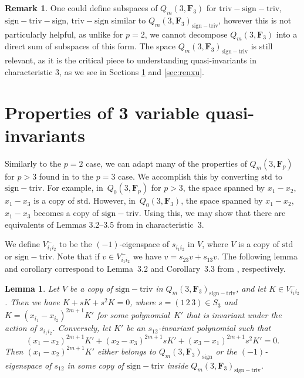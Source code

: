 \documentclass[11pt]{article}
\numberwithin{equation}{section}
\newtheorem{Lemma}[Theorem]{Lemma}
\theoremstyle{definition}
\newtheorem{Remark}[Theorem]{Remark}
\numberwithin{equation}{section}
\newcommand{\std}{\mathrm{std}}
\newcommand{\sign}{\mathrm{sign}}
\newcommand{\trix}{\mathrm{triv-sign-triv}}
\newcommand{\six}{\mathrm{sign-triv-sign}}
\newcommand{\siv}{\mathrm{sign-triv}}
\newcommand{\tign}{\mathrm{triv-sign}}
\begin{document}
\begin{Remark}
 One could define subspaces of $Q_m(3,\mathbf{F}_3)$ for $\trix$, $\six$, $\tign$ similar to $Q_m(3,\mathbf{F}_3)_{\siv}$, however this is not particularly helpful, as unlike for ${p=2}$, we cannot decompose $Q_m(3,\mathbf{F}_3)$ into a direct sum of subspaces of this form. The space $Q_m(3,\mathbf{F}_3)_{\siv}$ is still relevant, as it is the critical piece to understanding quasi-invariants in characteristic 3, as we see in Sections \ref{sec:wang} and \ref{sec:renxu}.
\end{Remark}

\setcounter{section}{3}
\section[Properties of 3 variable quasi-invariants]{Properties of $\boldsymbol{3}$ variable quasi-invariants}\label{sec:wang}
Similarly to the $p=2$ case, we can adapt many of the properties of $Q_m(3,\mathbf{F}_p)$ for $p>3$ found in \cite{wang2022explicit} to the $p=3$ case. We accomplish this by converting $\std$ to $\siv$. For example, in~$Q_0(3,\mathbf{F}_p)$ for $p>3$, the space spanned by $x_1-x_2$, $x_1-x_3$ is a copy of $\std$. However, in~$Q_0(3,\mathbf{F}_3)$, the space spanned by $x_1-x_2$, $x_1-x_3$ becomes a copy of $\siv$. Using this, we may show that there are equivalents of Lemmas 3.2--3.5 from \cite{wang2022explicit} in characteristic~$3$.

We define $V_{i_1i_2}^{-}$ to be the $(-1)$-eigenspace of $s_{i_1i_2}$ in $V$, where $V$ is a copy of $\std$ or $\siv$. Note that if $v\in V_{i_1i_2}^{-}$ we have $v=s_{23}v+s_{13}v$. The following lemma and corollary correspond to Lemma~3.2 and Corollary~3.3 from \cite{wang2022explicit}, respectively.

\begin{Lemma}\label{lem:3.1}
 Let $V$ be a copy of $\siv$ in $Q_m(3,\mathbf{F}_3)_{\siv}$, and let $K\in V_{i_1i_2}^{-}$. Then we have $K+sK+s^2K=0$, where $s=(1\,2\,3)\in S_3$ and $K=(x_{i_1}-x_{i_2})^{2m+1}K'$ for some polynomial~$K'$ that is invariant under the action of $s_{i_1i_2}$. Conversely, let $K'$ be an $s_{12}$-invariant polynomial such that
 \[(x_1-x_2)^{2m+1}K'+(x_2-x_3)^{2m+1}sK'+(x_3-x_1)^{2m+1}s^2K'=0.\]
 Then $(x_1-x_2)^{2m+1}K'$ either belongs to $Q_m(3,\mathbf{F}_3)_\sign$ or the $(-1)$-eigenspace of $s_{12}$ in some copy of $\siv$ inside $Q_m(3,\mathbf{F}_3)_\siv$.
\end{Lemma}
\end{document}
